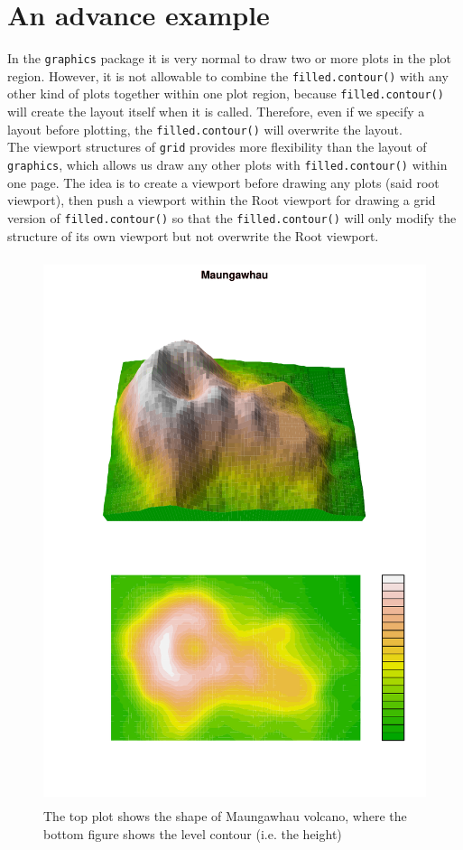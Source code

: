 \documentclass[paper=a4, fontsize=11pt]{report}
\begin{document}
\newpage
\section{An advance example}
In the \texttt{graphics} package it is very normal to draw two or more plots in the plot region. However, it is not allowable to combine the \texttt{filled.contour()} with any other kind of plots together within one plot region, because \texttt{filled.contour()} will create the layout itself when it is called. Therefore, even if we specify a layout before plotting, the \texttt{filled.contour()} will overwrite the layout.\\

The viewport structures of \texttt{grid} provides more flexibility than the layout of \texttt{graphics}, which allows us draw any other plots with \texttt{filled.contour()} within one page. The idea is to create a viewport before drawing any plots (said root viewport), then push a viewport within the Root viewport for drawing a grid version of \texttt{filled.contour()} so that the \texttt{filled.contour()} will only modify the structure of its own viewport but not overwrite the Root viewport.\\
\begin{figure}[H]
	\begin{center}
		\includegraphics[height = 16cm, width = 12cm]{figure/Chapter6_example_3_1.pdf}
		\caption{The top plot shows the shape of Maungawhau volcano, where the bottom figure shows the level contour (i.e. the height)}
		\label{Example_6.2.1}
	\end{center}
\end{figure}
\end{document}
